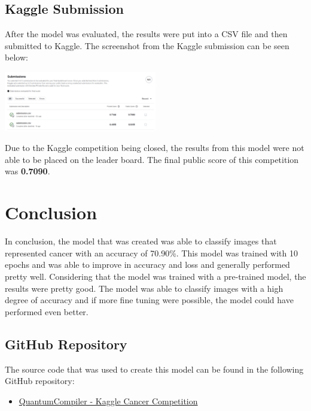 \documentclass[
	a4paper, %
	10pt, %
	unnumberedsections, %
	twoside, %
]{LTJournalArticle}
\begin{document}
\subsection{Kaggle Submission}

After the model was evaluated, the results were put into a CSV file and then submitted to Kaggle. The screenshot from the Kaggle submission can be seen below:

\begin{center}
	\includegraphics[width=0.5\textwidth]{Figures/Kaggle Results - Individual.png}
\end{center}

Due to the Kaggle competition being closed, the results from this model were not able to be placed on the leader board. The final public score of this competition was \textbf{0.7090}.

\section{Conclusion}

In conclusion, the model that was created was able to classify images that represented cancer with an accuracy of 70.90\%. This model was trained with 10 epochs and was able to improve in accuracy and loss
and generally performed pretty well. Considering that the model was trained with a pre-trained model, the results were pretty good. The model was able to classify images with a high degree of accuracy and
if more fine tuning were possible, the model could have performed even better.

\subsection{GitHub Repository}

The source code that was used to create this model can be found in the following GitHub repository:

\begin{itemize}
	\item \href{https://github.com/QuantumCompiler/Kaggle-Cancer-Competition}{QuantumCompiler - Kaggle Cancer Competition}
\end{itemize}
\end{document}
